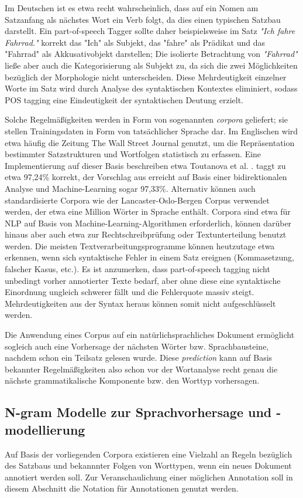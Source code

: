 \documentclass[12pt]{report}
\begin{document}
Im Deutschen ist es etwa recht wahrscheinlich, dass auf ein Nomen am Satzanfang als nächstes Wort ein Verb folgt, da dies einen typischen Satzbau darstellt. Ein part-of-speech Tagger sollte daher beispielsweise im Satz \textit{"Ich fahre Fahrrad."} korrekt das "Ich" als Subjekt, das "fahre" als Prädikat und das "Fahrrad" als Akkusativobjekt darstellen; Die isolierte Betrachtung von \textit{"Fahrrad"} ließe aber auch die Kategorisierung als Subjekt zu, da sich die zwei Möglichkeiten bezüglich der Morphologie nicht unterscheiden. Diese Mehrdeutigkeit einzelner Worte im Satz wird durch Analyse des syntaktischen Kontextes eliminiert, sodass POS tagging eine Eindeutigkeit der syntaktischen Deutung erzielt.

Solche Regelmäßigkeiten werden in Form von sogenannten \textit{corpora} geliefert; sie stellen Trainingsdaten in Form von tatsächlicher Sprache dar. Im Englischen wird etwa häufig die Zeitung The Wall Street Journal genutzt, um die Repräsentation bestimmter Satzstrukturen und Wortfolgen statistisch zu erfassen. Eine Implementierung auf dieser Basis beschreiben etwa Toutanova et al. \cite{tou03}. 
\cite{tou03} taggt zu etwa 97,24\% korrekt, der Vorschlag aus \cite{she07} erreicht auf Basis einer bidirektionalen Analyse und Machine-Learning sogar 97,33\%.
 Alternativ können auch standardisierte Corpora wie der Lancaster-Oslo-Bergen Corpus verwendet werden, der etwa eine Million Wörter in Sprache enthält. Corpora sind etwa für NLP auf Basis von Machine-Learning-Algorithmen erforderlich, können darüber hinaus aber auch etwa zur Rechtschreibprüfung oder Textunterteilung benutzt werden. Die meisten Textverarbeitungsprogramme können heutzutage etwa erkennen, wenn sich syntaktische Fehler in einem Satz ereignen (Kommasetzung, falscher Kasus, etc.). Es ist anzumerken, dass part-of-speech tagging nicht unbedingt vorher annotierter Texte bedarf, aber ohne diese eine syntaktische Einordnung ungleich schwerer fällt und die Fehlerquote massiv steigt. Mehrdeutigkeiten aus der Syntax heraus können somit nicht aufgeschlüsselt werden.

Die Anwendung eines Corpus auf ein natürlichsprachliches Dokument ermöglicht sogleich auch eine Vorhersage der nächsten Wörter bzw. Sprachbausteine, nachdem schon ein Teilsatz gelesen wurde. Diese \textit{prediction} kann auf Basis bekannter Regelmäßigkeiten also schon vor der Wortanalyse recht genau die nächste grammatikalische Komponente bzw. den Worttyp vorhersagen.

\subsection{N-gram Modelle zur Sprachvorhersage und -modellierung}
Auf Basis der vorliegenden Corpora existieren eine Vielzahl an Regeln bezüglich des Satzbaus und bekannnter Folgen von Worttypen, wenn ein neues Dokument annotiert werden soll. Zur Veranschaulichung einer möglichen Annotation soll in diesem Abschnitt die Notation \cite{clw7} für Annotationen genutzt werden.
\end{document}
